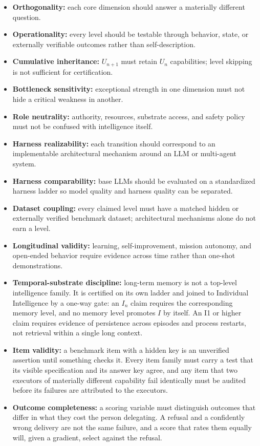 \documentclass[11pt]{article}
\theoremstyle{definition}
\begin{document}
\begin{itemize}
\item \textbf{Orthogonality:} each core dimension should answer a materially different question.
\item \textbf{Operationality:} every level should be testable through behavior, state, or externally verifiable outcomes rather than self-description.
\item \textbf{Cumulative inheritance:} $U_{n+1}$ must retain $U_n$ capabilities; level skipping is not sufficient for certification.
\item \textbf{Bottleneck sensitivity:} exceptional strength in one dimension must not hide a critical weakness in another.
\item \textbf{Role neutrality:} authority, resources, substrate access, and safety policy must not be confused with intelligence itself.
\item \textbf{Harness realizability:} each transition should correspond to an implementable architectural mechanism around an LLM or multi-agent system.
\item \textbf{Harness comparability:} base LLMs should be evaluated on a standardized harness ladder so model quality and harness quality can be separated.
\item \textbf{Dataset coupling:} every claimed level must have a matched hidden or externally verified benchmark dataset; architectural mechanisms alone do not earn a level.
\item \textbf{Longitudinal validity:} learning, self-improvement, mission autonomy, and open-ended behavior require evidence across time rather than one-shot demonstrations.
\item \textbf{Temporal-substrate discipline:} long-term memory is not a top-level intelligence family. It is certified on its own ladder and joined to Individual Intelligence by a one-way gate: an $I_n$ claim requires the corresponding memory level, and no memory level promotes $I$ by itself. An I1 or higher claim requires evidence of persistence across episodes and process restarts, not retrieval within a single long context.
\item \textbf{Item validity:} a benchmark item with a hidden key is an unverified assertion until something checks it. Every item family must carry a test that its visible specification and its answer key agree, and any item that two executors of materially different capability fail identically must be audited before its failures are attributed to the executors.
\item \textbf{Outcome completeness:} a scoring variable must distinguish outcomes that differ in what they cost the person delegating. A refusal and a confidently wrong delivery are not the same failure, and a score that rates them equally will, given a gradient, select against the refusal.
\end{itemize}
\end{document}
